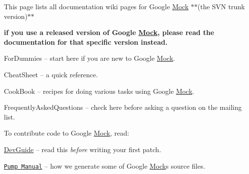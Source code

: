 This page lists all documentation wiki pages for Google \hyperlink{classMock}{Mock} $\ast$$\ast$(the S\+VN trunk version)$\ast$$\ast$
\begin{DoxyItemize}
\item {\bfseries if you use a released version of Google \hyperlink{classMock}{Mock}, please read the documentation for that specific version instead.}
\begin{DoxyItemize}
\item For\+Dummies -- start here if you are new to Google \hyperlink{classMock}{Mock}.
\item Cheat\+Sheet -- a quick reference.
\item Cook\+Book -- recipes for doing various tasks using Google \hyperlink{classMock}{Mock}.
\item Frequently\+Asked\+Questions -- check here before asking a question on the mailing list.
\end{DoxyItemize}
\end{DoxyItemize}

To contribute code to Google \hyperlink{classMock}{Mock}, read\+:


\begin{DoxyItemize}
\item \hyperlink{googletest_2docs_2DevGuide_8md}{Dev\+Guide} -- read this {\itshape before} writing your first patch.
\item \href{http://code.google.com/p/googletest/wiki/PumpManual}{\tt Pump Manual} -- how we generate some of Google \hyperlink{classMock}{Mock}\textquotesingle{}s source files. 
\end{DoxyItemize}